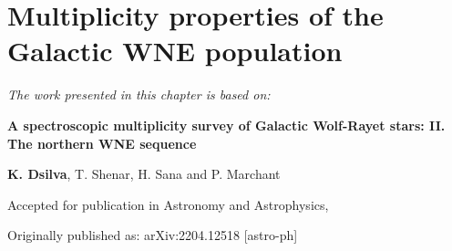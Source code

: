 \chapter{Multiplicity properties of the Galactic WNE population}\label{ch:wne}

\textit{The work presented in this chapter is based on:}

\textbf{A spectroscopic multiplicity survey of Galactic Wolf-Rayet stars: II. The northern WNE sequence}

\textbf{K. Dsilva}, T. Shenar, H. Sana and P. Marchant

Accepted for publication in {\sc Astronomy and Astrophysics}, 

Originally published as: \newline
arXiv:2204.12518 [astro-ph]

